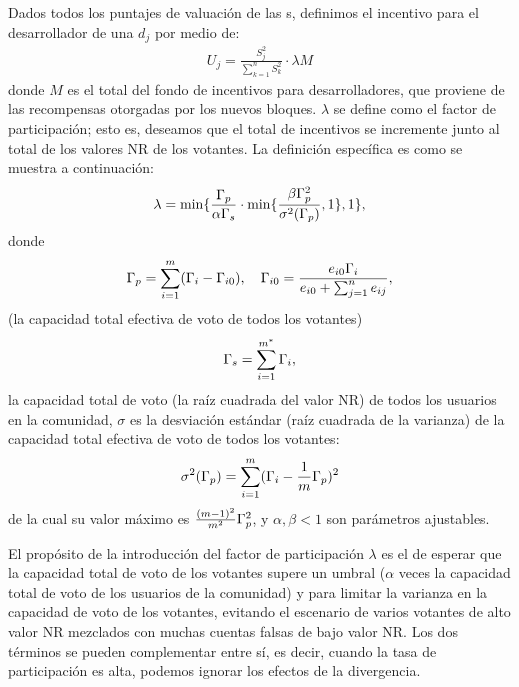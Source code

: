 Dados todos los puntajes de valuación de las {\dapp}s, definimos el incentivo para el desarrollador de una \dapp $d_j$ por medio de:
\begin{align}
	\label{eq:distribution}
	U_j = \frac{S_j^2}{\sum_{k=1}^n S_k^2}\cdot \lambda M
\end{align}
donde $M$ es el total del fondo de incentivos para desarrolladores, que proviene de las recompensas otorgadas por los nuevos bloques. $\lambda $ se define como el factor de participación; esto es, deseamos que el total de incentivos se incremente junto al total de los valores NR de los votantes. La definición específica es como se muestra a continuación:
\begin{align}
	\label{eq:participation}
	\lambda=\min\{\frac{\Gamma_p}{\alpha \Gamma_s }\cdot \min\{\frac{\beta\Gamma_p^2 }{\sigma^2(\Gamma_p)},1\},1\},
\end{align}
\noindent donde $$\Gamma_p = \sum_{i=1}^m (\Gamma_i-\Gamma_{i0}),\quad \Gamma_{i0} = \frac{e_{i0}\Gamma_i}{e_{i0}+\sum_{j=1}^n {e_{ij}}},$$ (la capacidad total efectiva de voto de todos los votantes)
$$\Gamma_s = \sum_{i=1}^{m^*} \Gamma_i,$$
\noindent la capacidad total de voto (la raíz cuadrada del valor NR) de todos los usuarios en la comunidad, $\sigma$ es la desviación estándar (raíz cuadrada de la varianza) de la capacidad total efectiva de voto de todos los votantes:
$$ \sigma^2(\Gamma_p) = \sum_{i=1}^m (\Gamma_i-\frac{1}{m}\Gamma_p)^2 $$
de la cual su valor máximo es $\frac{(m-1)^2}{m^2}\Gamma_p^2$, y $\alpha,\beta < 1$ son parámetros ajustables.

El propósito de la introducción del factor de participación $\lambda$ es el de esperar que la capacidad total de voto de los votantes supere un umbral ($\alpha$ veces la capacidad total de voto de los usuarios de la comunidad) y para limitar la varianza en la capacidad de voto de los votantes, evitando el escenario de varios votantes de alto valor NR mezclados con muchas cuentas falsas de bajo valor NR. Los dos términos se pueden complementar entre sí, es decir, cuando la tasa de participación es alta, podemos ignorar los efectos de la divergencia.